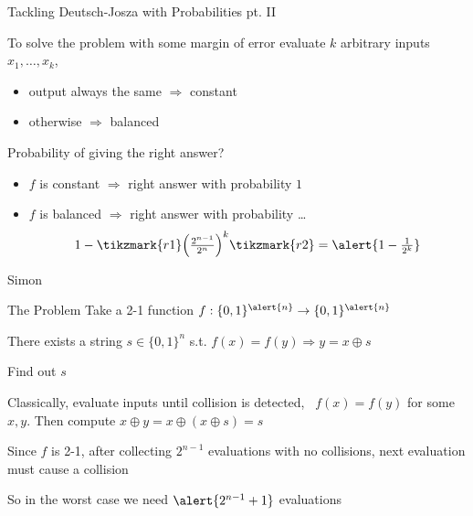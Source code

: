 \documentclass{beamer}
\begin{document}
\begin{frame}{Tackling Deutsch-Josza with Probabilities pt. II}

        To solve the problem with \alert{some margin of error} evaluate
        $k$ arbitrary inputs $x_1,\dots,x_k$,
        \begin{itemize}
                \item output always the same  $\Longrightarrow$ constant
                \item otherwise $\Longrightarrow$ balanced
        \end{itemize}
        \pause
        Probability of giving the right answer?

        \pause
        \begin{itemize}
                \item $f$ is constant $\Longrightarrow$ right answer
                        with probability $1$ 
                \item $f$ is balanced $\Longrightarrow$ right answer
                        with probability \dots
                        \[
                                \textstyle{ 1-  
                                \tikzmark{r1} \Big (\frac{2^{n-1}}{2^n} \Big)^k \tikzmark{r2}
                                = \alert{1 - \frac{1}{2^k}}
                                }
                        \]
        \end{itemize}


\end{frame}

\begin{frame}{Simon}
        \begin{block}{The Problem}
                Take a \alert{2-1} function $f : \{0,1\}^{\alert{n}} \to \{0,1\}^{\alert{n}}$

                There exists a string $s \in \{0,1\}^n$
                s.t.  $f(x) = f(y) \Rightarrow y = x \oplus s$

                Find out $s$
        \end{block}

        Classically, evaluate inputs until collision is detected, \ie\
        $f(x) = f(y)$ for some $x,y$. Then compute $x \oplus y =
        x \oplus (x \oplus s) = s$

        Since $f$ is 2-1, after collecting $2^{n-1}$ evaluations with no
        collisions, next evaluation must cause a collision

        So in the worst case we need $\alert{2^{n-1} + 1}$ evaluations
\end{frame}
\end{document}
